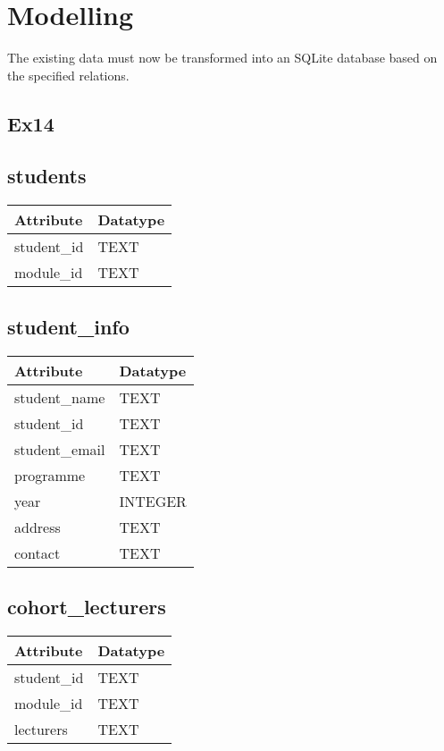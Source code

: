 \documentclass[12pt]{article}
\begin{document}
{{\section{Modelling}
The existing data must now be transformed into an SQLite database based on the specified relations.
\subsection{Ex14}

\subsection*{\centering students}
\begin{longtable}{|l|l|}
\hline
\textbf{Attribute} & \textbf{Datatype} \\ \hline
student\_id         & TEXT                 \\ \hline
module\_id          & TEXT                 \\ \hline
\end{longtable}

\subsection*{\centering student\_info}
\begin{longtable}{|l|l|}
\hline
\textbf{Attribute} & \textbf{Datatype} \\ \hline
student\_name       & TEXT                 \\ \hline
student\_id         & TEXT    \\ \hline
student\_email      & TEXT                 \\ \hline
programme           & TEXT                 \\ \hline
year                & INTEGER                 \\ \hline
address             & TEXT                 \\ \hline
contact             & TEXT                 \\ \hline
\end{longtable}

\subsection*{\centering cohort\_lecturers}
\begin{longtable}{|l|l|}
\hline
\textbf{Attribute} & \textbf{Datatype} \\ \hline
student\_id         & TEXT                 \\ \hline
module\_id          & TEXT                 \\ \hline
lecturers           & TEXT                 \\ \hline
\end{longtable}

}}
\end{document}
